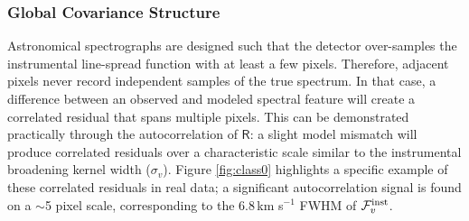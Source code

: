 \documentclass[iop,floatfix,numberedappendix,twocolappendix]{emulateapj}
\newcommand{\vR}{\mathsf{R}}
\begin{document}
\subsubsection{Global Covariance Structure} \label{subsec:global_covariance}

Astronomical spectrographs are designed such that the detector over-samples the instrumental 
line-spread function with at least a few pixels.  Therefore, adjacent pixels never record 
independent samples of the true spectrum.  In that case, a difference between an observed and 
modeled spectral feature will create a correlated residual that spans multiple pixels.  This can be 
demonstrated practically through the autocorrelation of $\vR$: a slight model mismatch will produce 
correlated residuals over a characteristic scale similar to the instrumental broadening kernel 
width ($\sigma_v$).  Figure \ref{fig:class0} highlights a specific example of these correlated 
residuals in real data; a significant autocorrelation signal is found on a $\sim$5 pixel scale, 
corresponding to the 6.8\,km s$^{-1}$ FWHM of $\mathcal{F}_v^{\rm inst}$.  
\end{document}
